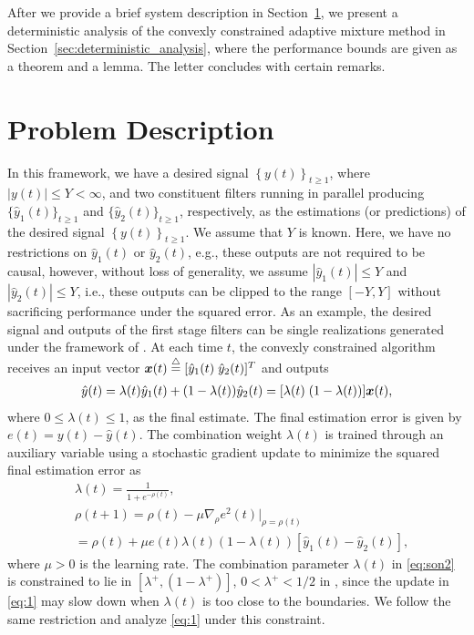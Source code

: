 \documentclass[journal]{IEEEtran}
\newcommand{\sy}{\left\{y(t)\right\}_{t \geq 1}}
\renewcommand{\vec}[1]{\mbox{\boldmath${#1}$}}
\newcommand{\vx}{\mbox{$\vec{x}$}}
\newcommand{\defi}{\stackrel{\bigtriangleup}{=}}
\begin{document}
After we provide a brief system description in
Section~\ref{sec:problem_description}, we present a deterministic
analysis of the convexly constrained adaptive mixture method in
Section~\ref{sec:deterministic_analysis}, where the performance bounds
are given as a theorem and a lemma. The letter concludes with certain
remarks.

\section{Problem Description}

\label{sec:problem_description}
In this framework, we have a desired signal $\sy$, where $|y(t)| \leq
Y <\infty$, and two constituent filters running in parallel producing
$\{\hat{y}_1(t)\}_{t \geq 1}$ and $\{\hat{y}_2(t)\}_{t \geq 1}$,
respectively, as the estimations (or predictions) of the desired
signal $\sy$. We assume that $Y$ is known. Here, we have no
restrictions on $\hat{y}_1(t)$ or $\hat{y}_2(t)$, e.g., these outputs
are not required to be causal, however, without loss of generality, we
assume $|\hat{y}_1(t)| \leq Y$ and $|\hat{y}_2(t)| \leq Y$, i.e.,
these outputs can be clipped to the range $[-Y,Y]$ without sacrificing
performance under the squared error. As an example, the desired signal
and outputs of the first stage filters can be single realizations
generated under the framework of \cite{convex}. At each time $t$, the
convexly constrained algorithm receives an input vector $\vx(t) \defi
[\hat{y}_1(t)\;\hat{y}_2(t)]^T$ and outputs
\begin{align*}
\hat{y}(t) = \lambda(t)  \hat{y}_1(t) + (1-\lambda(t)) \hat{y}_2(t) = [\lambda(t) \; (1-\lambda(t))] \vx(t),
\end{align*}\normalsize
where $0 \leq \lambda(t) \leq 1$, as the final estimate. The final estimation error is given by $e(t)=y(t) -
\hat{y}(t)$. The combination weight $\lambda(t)$ is trained through an
auxiliary variable using a stochastic gradient update to minimize the
squared final estimation error as
\begin{align}
& \lambda(t)  = \frac{1}{1+e^{-\rho(t)}} \label{eq:son2}, \\
& \rho(t+1)  = \rho(t)-\mu \nabla_{\rho}e^2(t)\big|_{\rho=\rho(t)} \nonumber \\
  & =  \rho(t)+ \mu e(t)\lambda(t)(1-\lambda(t)) [\hat{y}_1(t)-\hat{y}_2(t)], \label{eq:1}
\end{align}\normalsize
where $\mu > 0$ is the learning rate. The combination
parameter $\lambda(t)$ in \eqref{eq:son2} is constrained to lie in
$[\lambda^+,(1-\lambda^+)]$, $0<\lambda^+ < 1/2$ in \cite{convex},
since the update in \eqref{eq:1} may slow down when $\lambda(t)$ is
too close to the boundaries. We follow the same restriction and
analyze \eqref{eq:1} under this constraint.
\end{document}
